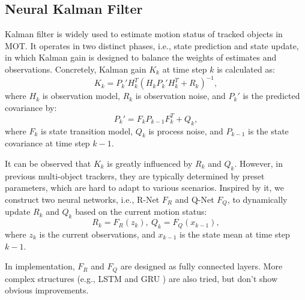 \documentclass[10pt,twocolumn,letterpaper]{article}
\begin{document}

\subsection{Neural Kalman Filter}
\label{sec_nkf}
    Kalman filter \cite{kalman1960new} is widely used to estimate motion status of tracked objects in MOT.
    It operates in two distinct phases, i.e., state prediction and state update,
    in which Kalman gain is designed to balance the weights of estimates and observations.
    Concretely, Kalman gain $K_k$ at time step $k$ is calculated as:
    \begin{equation}
        K_k = P_k' H_k^T (H_k P_k' H_k^T + R_k)^{-1}, \label{eq4}
    \end{equation}
    where $H_k$ is observation model, $R_k$ is observation noise, and $P_k'$ is the predicted covariance by:
    \begin{equation}
        P_k' = F_k P_{k-1} F_k^T + Q_k, \label{eq5}
    \end{equation}
    where $F_k$ is state transition model, $Q_k$ is process noise, and $P_{k-1}$ is the state covariance at time step $k-1$.

    It can be observed that $K_k$ is greatly influenced by $R_k$ and $Q_k$.
    However, in previous multi-object trackers, they are typically determined by preset parameters, which are hard to adapt to various scenarios.
    Inspired by it, we construct two neural networks, i.e., R-Net $F_R$ and Q-Net $F_Q$, to dynamically update $R_k$ and $Q_k$ based on the current motion status:
    \begin{equation}
        R_k = F_R (z_k),\ Q_k = F_Q (x_{k-1}),
    \end{equation}
    where $z_k$ is the current observations, and $x_{k-1}$ is the state mean at time step $k-1$.

    In implementation, $F_R$ and $F_Q$ are designed as fully connected layers.
    More complex structures (e.g., LSTM \cite{hochreiter1997long} and GRU \cite{cho2014learning}) are also tried, but don't show obvious improvements.
\end{document}
